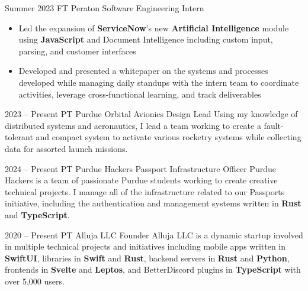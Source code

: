 \documentclass[
	10pt, %
]{FreemanCV}
\begin{document}
\begin{paracol}{2}
	\jobentry
	{Summer 2023} %
	{FT} %
	{Peraton} %
	{Software Engineering Intern} %
	{\vspace{-7mm}\begin{itemize}
			\item Led the expansion of \textbf{ServiceNow}'s new \textbf{Artificial Intelligence} module using \textbf{JavaScript} and Document Intelligence including custom input,\\ parsing, and customer interfaces
			\item Developed and presented a whitepaper on the systems and processes developed while managing daily standups with the intern team to coordinate activities, leverage cross-functional learning, and track deliverables
		\end{itemize}\vspace{-4mm}} %


	\jobentry
	{2023 -- Present} %
	{PT} %
	{Purdue Orbital} %
	{Avionics Design Lead} %
	{Using my knowledge of distributed systems and aeronautics, I lead a team working to create a fault-tolerant and compact system to activate various rocketry systems while collecting data for assorted launch missions.} %

	\jobentry
	{2024 -- Present}
	{PT}
	{Purdue Hackers}
	{Passport Infrastructure Officer}
	{Purdue Hackers is a team of passionate Purdue students working to create creative technical projects. I manage all of the infrastructure related to our Passports initiative, including the authentication and management systems written in \textbf{Rust} and \textbf{TypeScript}.}


	\jobentry
	{2020 -- Present} %
	{PT} %
	{Alluja LLC} %
	{Founder} %
	{Alluja LLC is a dynamic startup involved in multiple technical projects and initiatives including mobile apps written in \textbf{SwiftUI}, libraries in \textbf{Swift} and \textbf{Rust}, backend servers in \textbf{Rust} and \textbf{Python}, frontends in \textbf{Svelte} and \textbf{Leptos}, and BetterDiscord plugins in \textbf{TypeScript} with over 5,000 users.} %


\end{paracol}
\end{document}
